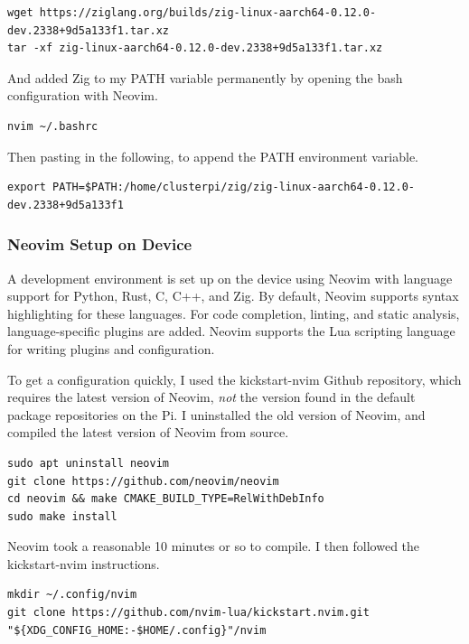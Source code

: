 \documentclass[12pt]{article}
\begin{document}
\begin{lstlisting}
wget https://ziglang.org/builds/zig-linux-aarch64-0.12.0-dev.2338+9d5a133f1.tar.xz 
tar -xf zig-linux-aarch64-0.12.0-dev.2338+9d5a133f1.tar.xz
\end{lstlisting}

And added Zig to my PATH variable permanently by opening the bash configuration with Neovim.

\begin{lstlisting}
nvim ~/.bashrc
\end{lstlisting}

Then pasting in the following, to append the PATH environment variable.

\begin{lstlisting}
export PATH=$PATH:/home/clusterpi/zig/zig-linux-aarch64-0.12.0-dev.2338+9d5a133f1
\end{lstlisting}

\subsubsection{Neovim Setup on Device}
A development environment is set up on the device using Neovim with language support for Python, Rust, C, C++, and Zig. By default, Neovim supports syntax highlighting for these languages. For code completion, linting, and static analysis, language-specific plugins are added. Neovim supports the Lua scripting language for writing plugins and configuration. 

To get a configuration quickly, I used the kickstart-nvim Github repository\cite{kickstart}, which requires the latest version of Neovim, \textit{not} the version found in the default package repositories on the Pi. I uninstalled the old version of Neovim, and compiled the latest version of Neovim from source.

\begin{lstlisting}
sudo apt uninstall neovim
git clone https://github.com/neovim/neovim
cd neovim && make CMAKE_BUILD_TYPE=RelWithDebInfo
sudo make install
\end{lstlisting}

Neovim took a reasonable 10 minutes or so to compile. I then followed the kickstart-nvim instructions.

\begin{lstlisting}
mkdir ~/.config/nvim
git clone https://github.com/nvim-lua/kickstart.nvim.git "${XDG_CONFIG_HOME:-$HOME/.config}"/nvim
\end{lstlisting}
\end{document}
